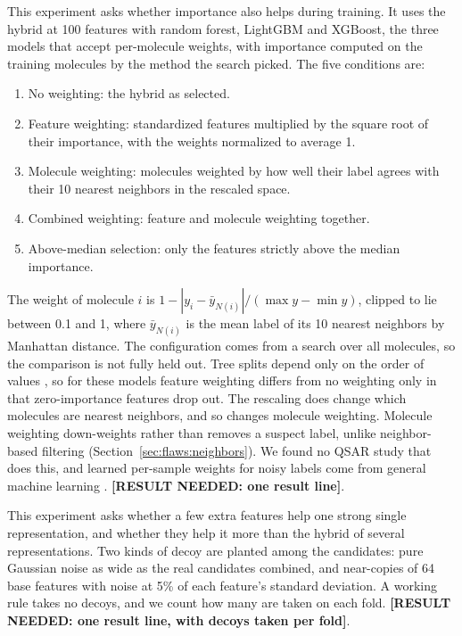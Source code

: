 This experiment asks whether importance also helps during training. It uses the hybrid at 100 features with random forest, LightGBM and XGBoost, the three models that accept per-molecule weights, with importance computed on the training molecules by the method the search picked. The five conditions are:
\begin{enumerate}[leftmargin=*]
    \item No weighting: the hybrid as selected.
    \item Feature weighting: standardized features multiplied by the square root of their importance, with the weights normalized to average 1.
    \item Molecule weighting: molecules weighted by how well their label agrees with their 10 nearest neighbors in the rescaled space.
    \item Combined weighting: feature and molecule weighting together.
    \item Above-median selection: only the features strictly above the median importance.
\end{enumerate}
The weight of molecule $i$ is $1 - |y_i - \bar y_{N(i)}| / (\max y - \min y)$, clipped to lie between 0.1 and 1, where $\bar y_{N(i)}$ is the mean label of its 10 nearest neighbors by Manhattan distance. The configuration comes from a search over all molecules, so the comparison is not fully held out. Tree splits depend only on the order of values \citep{Hastie2009}, so for these models feature weighting differs from no weighting only in that zero-importance features drop out. The rescaling does change which molecules are nearest neighbors, and so changes molecule weighting. Molecule weighting down-weights rather than removes a suspect label, unlike neighbor-based filtering (Section~\ref{sec:flaws:neighbors}). We found no QSAR study that does this, and learned per-sample weights for noisy labels come from general machine learning \citep{shu2019metaweightnet}. \textbf{[RESULT NEEDED: one result line]}.

This experiment asks whether a few extra features help one strong single representation, and whether they help it more than the hybrid of several representations. Two kinds of decoy are planted among the candidates: pure Gaussian noise as wide as the real candidates combined, and near-copies of 64 base features with noise at 5\% of each feature's standard deviation. A working rule takes no decoys, and we count how many are taken on each fold. \textbf{[RESULT NEEDED: one result line, with decoys taken per fold]}.

